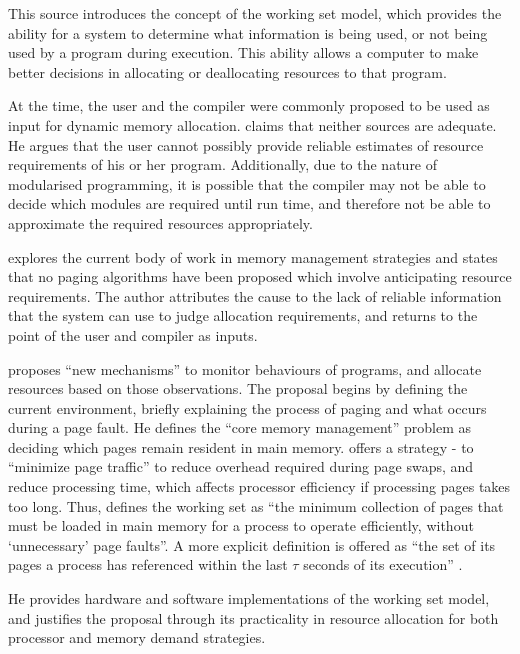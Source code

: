 This source introduces the concept of the working set model, which provides the ability for a system to determine what information is being used, or not being used by a program during execution. This ability allows a computer to make better decisions in allocating or deallocating resources to that program.

At the time, the user and the compiler were commonly proposed to be used as input for dynamic memory allocation. \citet[p. 15.1]{Denning1967} claims that neither sources are adequate. He argues that the user cannot possibly provide reliable estimates of resource requirements of his or her program. Additionally, due to the nature of modularised programming, it is possible that the compiler may not be able to decide which modules are required until run time, and therefore not be able to approximate the required resources appropriately.

\citet{Denning1967} explores the current body of work in memory management strategies and states that no paging algorithms have been proposed which involve anticipating resource requirements. The author attributes the cause to the lack of reliable information that the system can use to judge allocation requirements, and returns to the point of the user and compiler as inputs.

\citet[p. 15.2]{Denning1967} proposes ``new mechanisms'' to monitor behaviours of programs, and allocate resources based on those observations. The proposal begins by defining the current environment, briefly explaining the process of paging and what occurs during a page fault. He defines the ``core memory management'' problem as deciding which pages remain resident in main memory. \citet[p. 15.3]{Denning1967} offers a strategy - to ``minimize page traffic'' to reduce overhead required during page swaps, and reduce processing time, which affects processor efficiency if processing pages takes too long. Thus, \citet[p. 15.3]{Denning1967} defines the working set as ``the minimum collection of pages that must be loaded in main memory for a process to operate efficiently, without `unnecessary' page faults''. A more explicit definition is offered as ``the set of its pages a process has referenced within the last $\tau$ seconds of its execution'' \citep[p. 15.4]{Denning1967}.  

He provides hardware and software implementations of the working set model, and justifies the proposal through its practicality in resource allocation for both processor and memory demand strategies.

